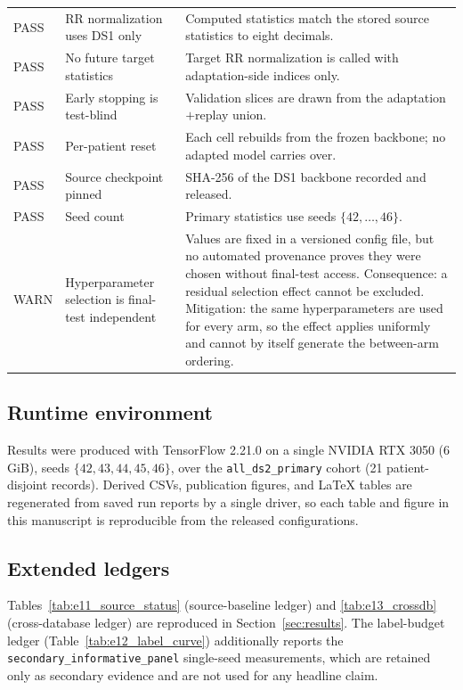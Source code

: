 \begin{longtable}{lp{3.5cm}p{5.4cm}}
PASS & RR normalization uses DS1 only & Computed statistics match the stored source statistics to eight decimals. \\
PASS & No future target statistics & Target RR normalization is called with adaptation-side indices only. \\
PASS & Early stopping is test-blind & Validation slices are drawn from the adaptation$+$replay union. \\
PASS & Per-patient reset & Each cell rebuilds from the frozen backbone; no adapted model carries over. \\
PASS & Source checkpoint pinned & SHA-256 of the DS1 backbone recorded and released. \\
PASS & Seed count & Primary statistics use seeds $\{42,\dots,46\}$. \\
WARN & Hyperparameter selection is final-test independent & Values are fixed in a versioned config file, but no automated provenance proves they were chosen without final-test access. Consequence: a residual selection effect cannot be excluded. Mitigation: the same hyperparameters are used for every arm, so the effect applies uniformly and cannot by itself generate the between-arm ordering. \\
\end{longtable}
\endgroup

\subsection{Runtime environment}

Results were produced with TensorFlow 2.21.0 on a single NVIDIA RTX 3050 (6\,GiB),
seeds $\{42,43,44,45,46\}$, over the \texttt{all\_ds2\_primary} cohort (21 patient-disjoint records).
Derived CSVs, publication figures, and LaTeX tables are regenerated from saved
run reports by a single driver, so each table and figure in this manuscript is
reproducible from the released configurations.

\subsection{Extended ledgers}

Tables~\ref{tab:e11_source_status} (source-baseline ledger) and \ref{tab:e13_crossdb}
(cross-database ledger) are reproduced in Section~\ref{sec:results}. The
label-budget ledger (Table~\ref{tab:e12_label_curve}) additionally reports the
\texttt{secondary\_informative\_panel} single-seed measurements, which are
retained only as secondary evidence and are not used for any headline claim.
